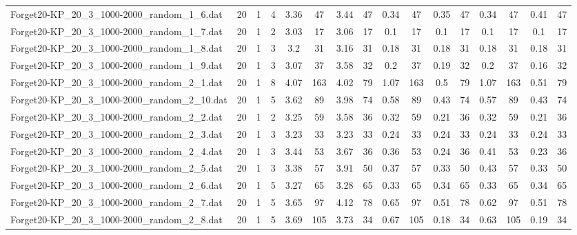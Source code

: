 \begin{sidewaystable}[!ht]
{\begin{tabular}{lccccccccccccccc}
Forget20-KP\_20\_3\_1000-2000\_random\_1\_6.dat & 20 & 1 & 4 & 3.36 & 47 & 3.44 & 47 &  \textcolor{blue2}{0.34} & 47 & 0.35 & 47 &  \textcolor{blue2}{0.34} & 47 & 0.41 & 47 \\
Forget20-KP\_20\_3\_1000-2000\_random\_1\_7.dat & 20 & 1 & 2 & 3.03 & 17 & 3.06 & 17 &  \textcolor{blue2}{0.1} & 17 &  \textcolor{blue2}{0.1} & 17 &  \textcolor{blue2}{0.1} & 17 &  \textcolor{blue2}{0.1} & 17 \\
Forget20-KP\_20\_3\_1000-2000\_random\_1\_8.dat & 20 & 1 & 3 & 3.2 & 31 & 3.16 & 31 &  \textcolor{blue2}{0.18} & 31 &  \textcolor{blue2}{0.18} & 31 &  \textcolor{blue2}{0.18} & 31 &  \textcolor{blue2}{0.18} & 31 \\
Forget20-KP\_20\_3\_1000-2000\_random\_1\_9.dat & 20 & 1 & 3 & 3.07 & 37 & 3.58 & 32 & 0.2 & 37 & 0.19 & 32 & 0.2 & 37 &  \textcolor{blue2}{0.16} & 32 \\
Forget20-KP\_20\_3\_1000-2000\_random\_2\_1.dat & 20 & 1 & 8 & 4.07 & 163 & 4.02 & 79 & 1.07 & 163 &  \textcolor{blue2}{0.5} & 79 & 1.07 & 163 & 0.51 & 79 \\
Forget20-KP\_20\_3\_1000-2000\_random\_2\_10.dat & 20 & 1 & 5 & 3.62 & 89 & 3.98 & 74 & 0.58 & 89 &  \textcolor{blue2}{0.43} & 74 & 0.57 & 89 &  \textcolor{blue2}{0.43} & 74 \\
Forget20-KP\_20\_3\_1000-2000\_random\_2\_2.dat & 20 & 1 & 2 & 3.25 & 59 & 3.58 & 36 & 0.32 & 59 &  \textcolor{blue2}{0.21} & 36 & 0.32 & 59 &  \textcolor{blue2}{0.21} & 36 \\
Forget20-KP\_20\_3\_1000-2000\_random\_2\_3.dat & 20 & 1 & 3 & 3.23 & 33 & 3.23 & 33 & 0.24 & 33 & 0.24 & 33 & 0.24 & 33 & 0.24 & 33 \\
Forget20-KP\_20\_3\_1000-2000\_random\_2\_4.dat & 20 & 1 & 3 & 3.44 & 53 & 3.67 & 36 & 0.36 & 53 & 0.24 & 36 & 0.41 & 53 &  \textcolor{blue2}{0.23} & 36 \\
Forget20-KP\_20\_3\_1000-2000\_random\_2\_5.dat & 20 & 1 & 3 & 3.38 & 57 & 3.91 & 50 & 0.37 & 57 & 0.33 & 50 & 0.43 & 57 & 0.33 & 50 \\
Forget20-KP\_20\_3\_1000-2000\_random\_2\_6.dat & 20 & 1 & 5 & 3.27 & 65 & 3.28 & 65 &  \textcolor{blue2}{0.33} & 65 & 0.34 & 65 &  \textcolor{blue2}{0.33} & 65 & 0.34 & 65 \\
Forget20-KP\_20\_3\_1000-2000\_random\_2\_7.dat & 20 & 1 & 5 & 3.65 & 97 & 4.12 & 78 & 0.65 & 97 &  \textcolor{blue2}{0.51} & 78 & 0.62 & 97 &  \textcolor{blue2}{0.51} & 78 \\
Forget20-KP\_20\_3\_1000-2000\_random\_2\_8.dat & 20 & 1 & 5 & 3.69 & 105 & 3.73 & 34 & 0.67 & 105 &  \textcolor{blue2}{0.18} & 34 & 0.63 & 105 & 0.19 & 34 \\

\end{tabular}}
\end{sidewaystable}
